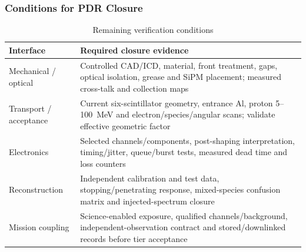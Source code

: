 \subsubsection{Conditions for PDR Closure}\label{app:payload-transport}\label{app:payload-calibration}
\begin{table}[H]\centering\small
\caption{Remaining verification conditions}\label{tab:fpdu-response-matrix}
\begin{tabularx}{\linewidth}{@{}p{3.4cm}X@{}}\toprule
Interface & Required closure evidence\\\midrule
Mechanical / optical & Controlled CAD/ICD, material, front treatment, gaps, optical isolation, grease and SiPM placement; measured cross-talk and collection maps\\
Transport / acceptance & Current six-scintillator geometry, entrance Al, proton 5--100~MeV and electron/species/angular scans; validate effective geometric factor\\
Electronics & Selected channels/components, post-shaping interpretation, timing/jitter, queue/burst tests, measured dead time and loss counters\\
Reconstruction & Independent calibration and test data, stopping/penetrating response, mixed-species confusion matrix and injected-spectrum closure\\
Mission coupling & Science-enabled exposure, qualified channels/background, independent-observation contract and stored/downlinked records before tier acceptance\\\bottomrule
\end{tabularx}\end{table}
